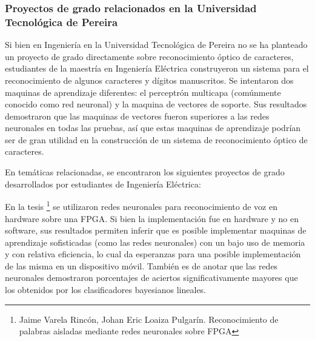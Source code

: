 \documentclass[a4paper, 11pt, oneside]{article}
\begin{document}
	\subsubsection{Proyectos de grado relacionados en la Universidad Tecnológica de Pereira}
	Si bien en Ingeniería en la Universidad Tecnológica de Pereira no se ha planteado un proyecto 
    de grado directamente sobre reconocimiento óptico de caracteres, estudiantes de la maestría en
    Ingeniería Eléctrica construyeron un sistema para el reconocimiento de algunos caracteres 
    y dígitos manuscritos. Se intentaron dos maquinas de aprendizaje diferentes:
	el perceptrón multicapa (comúnmente conocido como red neuronal) y la maquina de vectores de
	soporte. Sus resultados demostraron que las maquinas de vectores fueron superiores a las redes
    neuronales en todas las pruebas, así que estas maquinas de aprendizaje podrían ser de gran 
    utilidad en la construcción de un sistema de reconocimiento óptico de caracteres.\newline

	En temáticas relacionadas, se encontraron los siguientes proyectos de grado desarrollados por 
    estudiantes de Ingeniería Eléctrica:\newline 

    En la tesis \footnote{Jaime Varela Rincón, Johan Eric Loaiza Pulgarín. Reconocimiento de palabras
    aisladas mediante redes neuronales sobre FPGA} se utilizaron redes neuronales para reconocimiento
    de voz en hardware sobre una FPGA. 
    Si bien la implementación fue en hardware y no en software, sus resultados permiten inferir que es 
    posible implementar maquinas de aprendizaje sofisticadas (como las redes neuronales) con un bajo uso
    de memoria y con relativa eficiencia, lo cual da esperanzas para una posible implementación de las 
    misma en un dispositivo móvil. También es de anotar que las redes neuronales demostraron porcentajes 
    de aciertos significativamente mayores que los obtenidos por los clasificadores bayesianos lineales.
	\newline
\end{document}
